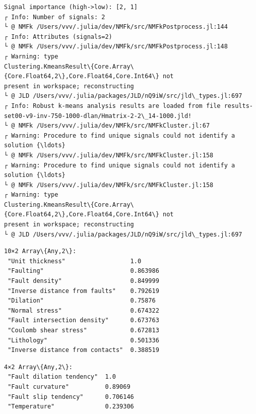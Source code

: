 \documentclass[11pt]{article}
\begin{document}
    \begin{Verbatim}[commandchars=\\\{\}]
Signal importance (high->low): [2, 1]
┌ Info: Number of signals: 2
└ @ NMFk /Users/vvv/.julia/dev/NMFk/src/NMFkPostprocess.jl:144
┌ Info: Attributes (signals=2)
└ @ NMFk /Users/vvv/.julia/dev/NMFk/src/NMFkPostprocess.jl:148
┌ Warning: type
Clustering.KmeansResult\{Core.Array\{Core.Float64,2\},Core.Float64,Core.Int64\} not
present in workspace; reconstructing
└ @ JLD /Users/vvv/.julia/packages/JLD/nQ9iW/src/jld\_types.jl:697
┌ Info: Robust k-means analysis results are loaded from file results-
set00-v9-inv-750-1000-dlan/Hmatrix-2-2\_14-1000.jld!
└ @ NMFk /Users/vvv/.julia/dev/NMFk/src/NMFkCluster.jl:67
┌ Warning: Procedure to find unique signals could not identify a solution {\ldots}
└ @ NMFk /Users/vvv/.julia/dev/NMFk/src/NMFkCluster.jl:158
┌ Warning: Procedure to find unique signals could not identify a solution {\ldots}
└ @ NMFk /Users/vvv/.julia/dev/NMFk/src/NMFkCluster.jl:158
┌ Warning: type
Clustering.KmeansResult\{Core.Array\{Core.Float64,2\},Core.Float64,Core.Int64\} not
present in workspace; reconstructing
└ @ JLD /Users/vvv/.julia/packages/JLD/nQ9iW/src/jld\_types.jl:697
    \end{Verbatim}


    \begin{Verbatim}[commandchars=\\\{\}]
10×2 Array\{Any,2\}:
 "Unit thickness"                  1.0
 "Faulting"                        0.863986
 "Fault density"                   0.849999
 "Inverse distance from faults"    0.792619
 "Dilation"                        0.75876
 "Normal stress"                   0.674322
 "Fault intersection density"      0.673763
 "Coulomb shear stress"            0.672813
 "Lithology"                       0.501336
 "Inverse distance from contacts"  0.388519
    \end{Verbatim}



    \begin{Verbatim}[commandchars=\\\{\}]
4×2 Array\{Any,2\}:
 "Fault dilation tendency"  1.0
 "Fault curvature"          0.89069
 "Fault slip tendency"      0.706146
 "Temperature"              0.239306
    \end{Verbatim}


    \begin{center}
    \end{center}
    { \hspace*{\fill} \\}
\end{document}
